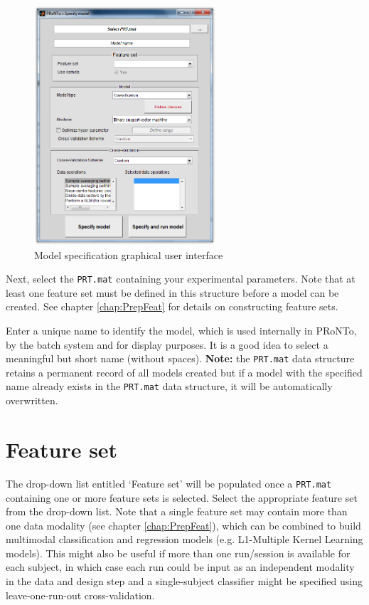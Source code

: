 \begin{figure}[!h]
\begin{center}
\includegraphics[height=3.5in]{images/prt_ui_model.png}
\caption{Model specification graphical user interface}
 \label{fig_specify_model}
\end{center}
\end{figure}

Next, select the \texttt{PRT.mat} containing your experimental parameters. Note that at least one feature set must be defined in this structure before a model can be created. See chapter \ref{chap:PrepFeat} for details on constructing feature sets.

Enter a unique name to identify the model, which is used internally in PRoNTo, by the batch system and for display purposes. It is a good idea to select a meaningful but short name (without spaces). \textbf{Note:} the \texttt{PRT.mat} data structure retains a permanent record of all models created but if a model with the specified name already exists in the \texttt{PRT.mat} data structure, it will be automatically overwritten.

\section{Feature set}
The drop-down list entitled `Feature set' will be populated once a \texttt{PRT.mat} containing one or more feature sets is selected. Select the appropriate feature set from the drop-down list. Note that a single feature set may contain more than one data modality (see chapter \ref{chap:PrepFeat}), which can be combined to build multimodal classification and regression models (e.g. L1-Multiple Kernel Learning models). This might also be useful if more than one run/session is available for each subject, in which case each run could be input as an independent modality in the data and design step and a single-subject classifier might be specified using leave-one-run-out cross-validation. 

